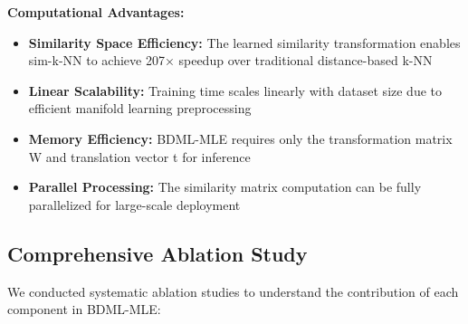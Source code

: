 \documentclass[review]{elsarticle}
\begin{document}
\textbf{Computational Advantages:}

\begin{itemize}
\item \textbf{Similarity Space Efficiency:} The learned similarity transformation enables sim-k-NN to achieve 207× speedup over traditional distance-based k-NN
\item \textbf{Linear Scalability:} Training time scales linearly with dataset size due to efficient manifold learning preprocessing
\item \textbf{Memory Efficiency:} BDML-MLE requires only the transformation matrix W and translation vector t for inference
\item \textbf{Parallel Processing:} The similarity matrix computation can be fully parallelized for large-scale deployment
\end{itemize}

\subsection{Comprehensive Ablation Study}

We conducted systematic ablation studies to understand the contribution of each component in BDML-MLE:
\end{document}
